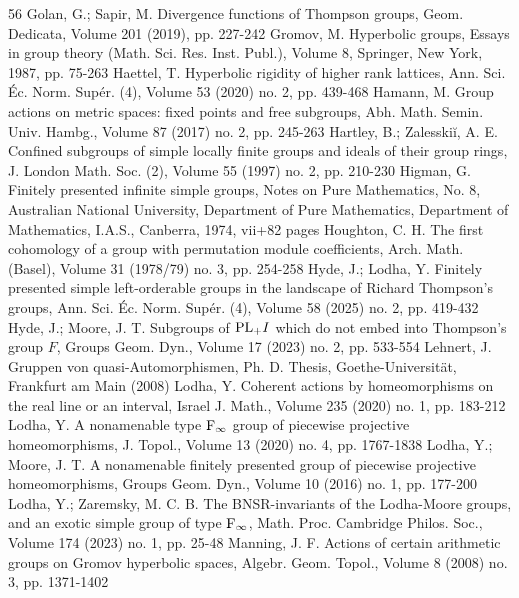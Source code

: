 \begin{thebibliography}{56}
Golan, G.; Sapir, M. Divergence functions of Thompson groups, Geom. Dedicata, Volume 201 (2019), pp. 227-242
Gromov, M. Hyperbolic groups, Essays in group theory (Math. Sci. Res. Inst. Publ.), Volume 8, Springer, New York, 1987, pp. 75-263
Haettel, T. Hyperbolic rigidity of higher rank lattices, Ann. Sci. Éc. Norm. Supér. (4), Volume 53 (2020) no. 2, pp. 439-468
Hamann, M. Group actions on metric spaces: fixed points and free subgroups, Abh. Math. Semin. Univ. Hambg., Volume 87 (2017) no. 2, pp. 245-263
Hartley, B.; Zalesskiĭ, A. E. Confined subgroups of simple locally finite groups and ideals of their group rings, J. London Math. Soc. (2), Volume 55 (1997) no. 2, pp. 210-230
Higman, G. Finitely presented infinite simple groups, Notes on Pure Mathematics, No. 8, Australian National University, Department of Pure Mathematics, Department of Mathematics, I.A.S., Canberra, 1974, vii+82 pages
Houghton, C. H. The first cohomology of a group with permutation module coefficients, Arch. Math. (Basel), Volume 31 (1978/79) no. 3, pp. 254-258
Hyde, J.; Lodha, Y. Finitely presented simple left-orderable groups in the landscape of Richard Thompson’s groups, Ann. Sci. Éc. Norm. Supér. (4), Volume 58 (2025) no. 2, pp. 419-432
Hyde, J.; Moore, J. T. Subgroups of ${\rm {PL}}_+{I}$ which do not embed into Thompson’s group ${F}$, Groups Geom. Dyn., Volume 17 (2023) no. 2, pp. 533-554
Lehnert, J. Gruppen von quasi-Automorphismen, Ph. D. Thesis, Goethe-Universität, Frankfurt am Main (2008)
Lodha, Y. Coherent actions by homeomorphisms on the real line or an interval, Israel J. Math., Volume 235 (2020) no. 1, pp. 183-212
Lodha, Y. A nonamenable type $\rm {F}_\infty $ group of piecewise projective homeomorphisms, J. Topol., Volume 13 (2020) no. 4, pp. 1767-1838
Lodha, Y.; Moore, J. T. A nonamenable finitely presented group of piecewise projective homeomorphisms, Groups Geom. Dyn., Volume 10 (2016) no. 1, pp. 177-200
Lodha, Y.; Zaremsky, M. C. B. The BNSR-invariants of the Lodha-Moore groups, and an exotic simple group of type ${\rm {F}}_\infty $, Math. Proc. Cambridge Philos. Soc., Volume 174 (2023) no. 1, pp. 25-48
Manning, J. F. Actions of certain arithmetic groups on Gromov hyperbolic spaces, Algebr. Geom. Topol., Volume 8 (2008) no. 3, pp. 1371-1402

\end{thebibliography}
